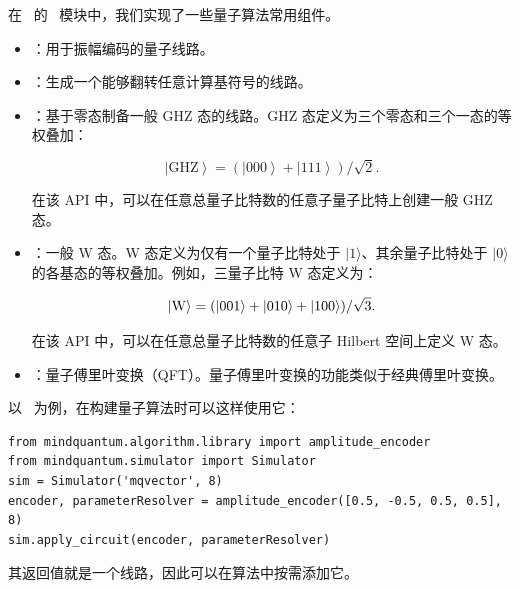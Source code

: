 在 \MindQuantum\ 的 \library\ 模块中，我们实现了一些量子算法常用组件。

\begin{itemize}

    \item \amplitudeencoder：用于振幅编码的量子线路。

    \item \bitphaseflipoperator：生成一个能够翻转任意计算基符号的线路。

    \item \generalghzstate：基于零态制备一般 GHZ 态的线路。GHZ 态定义为三个零态和三个一态的等权叠加：

          \begin{equation}
              \left|\text{GHZ}\right> = (\left|000\right> + \left|111\right>)/\sqrt{2}.
          \end{equation}

          在该 API 中，可以在任意总量子比特数的任意子量子比特上创建一般 GHZ 态。

    \item \generalwstate：一般 W 态。W 态定义为仅有一个量子比特处于 $|1\rangle$、其余量子比特处于 $|0\rangle$ 的各基态的等权叠加。例如，三量子比特 W 态定义为：

          \begin{equation}
              \left|\rm W\right> = (\left|001\right> + \left|010\right> + \left|100\right>)/\sqrt{3}.
          \end{equation}

          在该 API 中，可以在任意总量子比特数的任意子 Hilbert 空间上定义 W 态。

    \item \qft：量子傅里叶变换（QFT）。量子傅里叶变换的功能类似于经典傅里叶变换。
\end{itemize}

以 \amplitudeencoder\ 为例，在构建量子算法时可以这样使用它：
\begin{lstlisting}
from mindquantum.algorithm.library import amplitude_encoder
from mindquantum.simulator import Simulator
sim = Simulator('mqvector', 8)
encoder, parameterResolver = amplitude_encoder([0.5, -0.5, 0.5, 0.5], 8)
sim.apply_circuit(encoder, parameterResolver)
\end{lstlisting}
其返回值就是一个线路，因此可以在算法中按需添加它。
